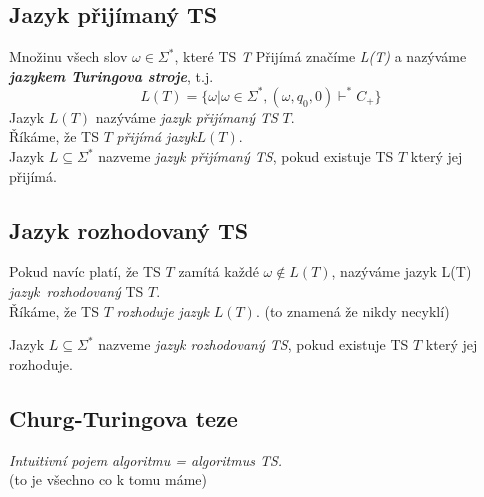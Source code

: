 \documentclass[10pt,a4paper]{article}
\begin{document}
	\subsection{Jazyk přijímaný TS}

		Množinu všech slov $\omega \in \Sigma^{*}$, které TS \textit{T} Přijímá značíme \textit{L(T)} a nazýváme 					\textit{\textbf{jazykem Turingova stroje}}, t.j.
		 $$L(T) = \{ \omega | \omega \in \Sigma^{*}, (\omega, q_{0},0) \vdash^{*} C_{+}\} $$
		Jazyk $L(T)$ nazýváme \textit{jazyk přijímaný TS} $T$.\\
		Říkáme, že TS $T$ \textit{přijímá jazyk}$ L(T)$.\\		 
	
		Jazyk $L \subseteq \Sigma^{*} $ nazveme\textit{ jazyk přijímaný TS}, pokud existuje TS $T$ který jej přijímá.

	\subsection{Jazyk rozhodovaný TS}

		Pokud navíc platí, že TS $T$ zamítá každé $\omega \notin L(T)$, nazýváme jazyk L(T) 
		\textit{jazyk~rozhodovaný} TS $T$.\\
		Říkáme, že TS $T$ \textit{rozhoduje jazyk} $L(T)$. (to znamená že nikdy necyklí)

		Jazyk $L \subseteq \Sigma^{*} $ nazveme\textit{ jazyk rozhodovaný TS}, pokud existuje TS $T$ který jej rozhoduje.
	

	\subsection{Churg-Turingova teze}

		\textit{Intuitivní pojem algoritmu = algoritmus TS.} \\(to je všechno co k tomu máme)
\end{document}
